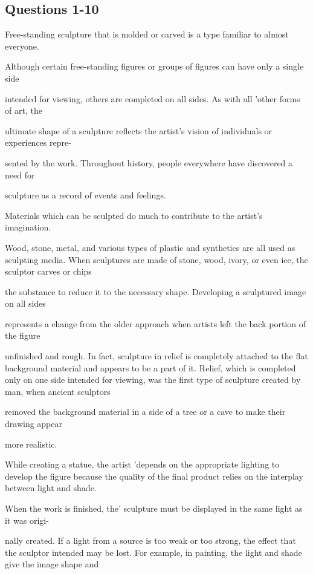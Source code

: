 \documentclass[12pt]{article}
\begin{document}
\subsection*{Questions 1-10}
\begingroup
\small
\sloppy
\setlength{\parskip}{0pt}
\setlength{\parindent}{0pt}
Free-standing sculpture that is molded or carved is a type familiar to almost everyone.\par
Although certain free-standing figures or groups of figures can have only a single side\par
intended for viewing, others are completed on all sides. As with all 'other forms of art, the\par
ultimate shape of a sculpture reflects the artist's vision of individuals or experiences repre-\par
sented by the work. Throughout history, people everywhere have discovered a need for\par
sculpture as a record of events and feelings.\par
Materials which can be sculpted do much to contribute to the artist's imagination.\par
Wood, stone, metal, and various types of plastic and synthetics are all used as sculpting media. When sculptures are made of stone, wood, ivory, or even ice, the sculptor carves or chips\par
the substance to reduce it to the necessary shape. Developing a sculptured image on all sides\par
represents a change from the older approach when artists left the back portion of the figure\par
unfinished and rough. In fact, sculpture in relief is completely attached to the flat background material and appears to be a part of it. Relief, which is completed only on one side intended for viewing, was the first type of sculpture created by man, when ancient sculptors\par
removed the background material in a side of a tree or a cave to make their drawing appear\par
more realistic.\par
While creating a statue, the artist 'depends on the appropriate lighting to develop the figure because the quality of the final product relies on the interplay between light and shade.\par
When the work is finished, the' sculpture must be displayed in the same light as it was origi-\par
nally created. If a light from a source is too weak or too strong, the effect that the sculptor intended may be lost. For example, in painting, the light and shade give the image shape and\par
\end{document}
